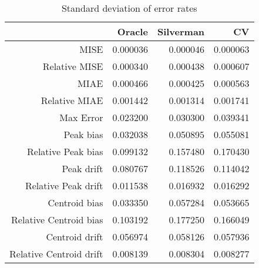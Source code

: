 \begin{table}[ht]
\centering
\begin{tabular}{rrrr}
  \hline
 & Oracle & Silverman & CV \\ 
  \hline
MISE & 0.000036 & 0.000046 & 0.000063 \\ 
  Relative MISE & 0.000340 & 0.000438 & 0.000607 \\ 
  MIAE & 0.000466 & 0.000425 & 0.000563 \\ 
  Relative MIAE & 0.001442 & 0.001314 & 0.001741 \\ 
  Max Error & 0.023200 & 0.030300 & 0.039341 \\ 
  Peak bias & 0.032038 & 0.050895 & 0.055081 \\ 
  Relative Peak bias & 0.099132 & 0.157480 & 0.170430 \\ 
  Peak drift & 0.080767 & 0.118526 & 0.114042 \\ 
  Relative Peak drift & 0.011538 & 0.016932 & 0.016292 \\ 
  Centroid bias & 0.033350 & 0.057284 & 0.053665 \\ 
  Relative Centroid bias & 0.103192 & 0.177250 & 0.166049 \\ 
  Centroid drift & 0.056974 & 0.058126 & 0.057936 \\ 
  Relative Centroid drift & 0.008139 & 0.008304 & 0.008277 \\ 
   \hline
\end{tabular}
\caption{Standard deviation of error rates} 
\label{tbl:stddev_error_rates}
\end{table}
